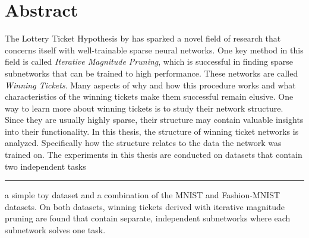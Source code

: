 \chapter*{Abstract}

The Lottery Ticket Hypothesis by \textcite{LTH} has sparked a novel field of research that concerns itself with well-trainable sparse neural networks.
One key method in this field is called \textit{Iterative Magnitude Pruning}, which is successful in finding sparse subnetworks that can be trained to high performance. These networks are called \textit{Winning Tickets}.
Many aspects of why and how this procedure works and what characteristics of the winning tickets make them successful remain elusive.
One way to learn more about winning tickets is to study their network structure.
Since they are usually highly sparse, their structure may contain valuable insights into their functionality.
In this thesis, the structure of winning ticket networks is analyzed. 
Specifically how the structure relates to the data the network was trained on.
The experiments in this thesis are conducted on datasets that contain two independent tasks \rule[0.5ex]{.5em}{0.5pt} a simple toy dataset and a combination of the MNIST and Fashion-MNIST datasets.
On both datasets, winning tickets derived with iterative magnitude pruning are found that contain separate, independent subnetworks where each subnetwork solves one task.

